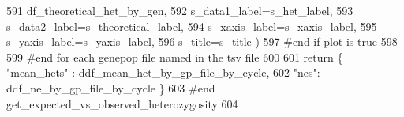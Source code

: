 \begin{DoxyCode}
591                                         df\_theoretical\_het\_by\_gen, 
592                                         s\_data1\_label=s\_het\_label,
593                                         s\_data2\_label=s\_theoretical\_label,
594                                         s\_xaxis\_label=s\_xaxis\_label,
595                                         s\_yaxis\_label=s\_yaxis\_label,
596                                         s\_title=s\_title )
597         \textcolor{comment}{#end if plot is true}
598 
599     \textcolor{comment}{#end for each genepop file named in the tsv file}
600 
601     \textcolor{keywordflow}{return} \{ \textcolor{stringliteral}{"mean\_hets"} : ddf\_mean\_het\_by\_gp\_file\_by\_cycle, 
602                     \textcolor{stringliteral}{"nes"}: ddf\_ne\_by\_gp\_file\_by\_cycle  \}
603 \textcolor{comment}{#end get\_expected\_vs\_observed\_heterozygosity}
604         
\end{DoxyCode}
